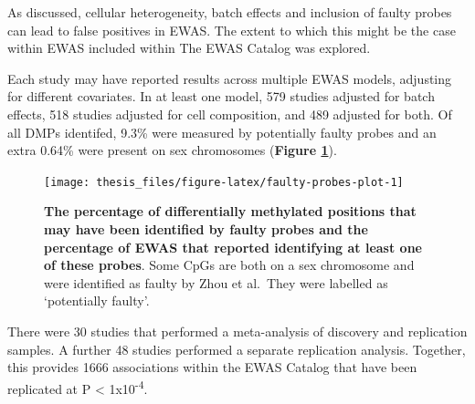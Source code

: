 \documentclass[11pt,oneside]{bristolthesis}
\begin{document}
As discussed, cellular heterogeneity, batch effects and inclusion of faulty probes can lead to false positives in EWAS. The extent to which this might be the case within EWAS included within The EWAS Catalog was explored.

Each study may have reported results across multiple EWAS models, adjusting for different covariates. In at least one model, 579 studies adjusted for batch effects, 518 studies adjusted for cell composition, and 489 adjusted for both. Of all DMPs identifed, 9.3\% were measured by potentially faulty probes and an extra 0.64\% were present on sex chromosomes (\textbf{Figure \ref{fig:faulty-probes-plot}}).




\begin{figure}

{\centering \texttt{[image: thesis\_files/figure-latex/faulty-probes-plot-1]} 

}

\caption[The percentage of differentially methylated positions that may have been identified by faulty probes and the percentage of EWAS that reported identifying at least one of these probes]{\textbf{The percentage of differentially methylated positions that may have been identified by faulty probes and the percentage of EWAS that reported identifying at least one of these probes}. Some CpGs are both on a sex chromosome and were identified as faulty by Zhou et al.~They were labelled as `potentially faulty'.}\label{fig:faulty-probes-plot}
\end{figure}
There were 30 studies that performed a meta-analysis of discovery and replication samples. A further 48 studies performed a separate replication analysis. Together, this provides 1666 associations within the EWAS Catalog that have been replicated at P \textless{} 1x10\textsuperscript{-4}.
\end{document}
